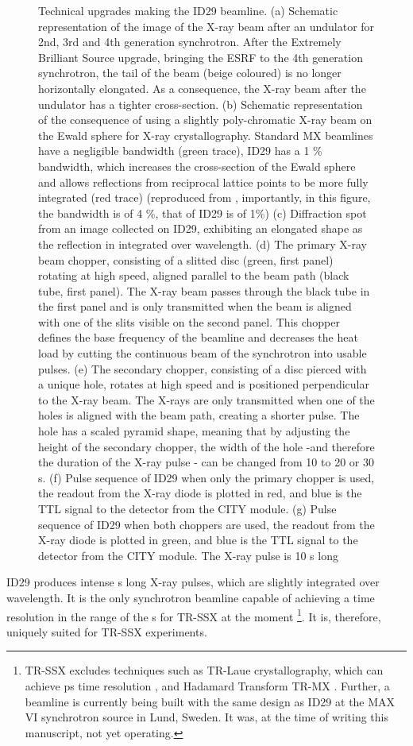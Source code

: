 \begin{figure}[H]
    \caption{Technical upgrades making the ID29 beamline. (a) Schematic representation of the image of the X-ray beam after an undulator for 2nd, 3rd and 4th generation synchrotron. After the Extremely Brilliant Source upgrade, bringing the ESRF to the 4th generation synchrotron, the tail of the beam (beige coloured) is no longer horizontally elongated. As a consequence, the X-ray beam after the undulator has a tighter cross-section. (b) Schematic representation of the consequence of using a slightly poly-chromatic X-ray beam on the Ewald sphere for X-ray crystallography. Standard MX beamlines have a negligible bandwidth (green trace), ID29 has a 1 \% bandwidth, which increases the cross-section of the Ewald sphere and allows reflections from reciprocal lattice points to be more fully integrated (red trace) (reproduced from \cite{dejoieUsingNonmonochromaticMicrobeam2013}, importantly, in this figure, the bandwidth is of 4 \%, that of ID29 is of 1\%) (c) Diffraction spot from an image collected on ID29, exhibiting an elongated shape as the reflection in integrated over wavelength. (d) The primary X-ray beam chopper, consisting of a slitted disc (green, first panel) rotating at high speed, aligned parallel to the beam path (black tube, first panel). The X-ray beam passes through the black tube in the first panel and is only transmitted when the beam is aligned with one of the slits visible on the second panel. This chopper defines the base frequency of the beamline and decreases the heat load by cutting the continuous beam of the synchrotron into usable pulses.  (e) The secondary chopper, consisting of a disc pierced with a unique hole, rotates at high speed and is positioned perpendicular to the X-ray beam. The X-rays are only transmitted when one of the holes is aligned with the beam path,  creating a shorter pulse. The hole has a scaled pyramid shape, meaning that by adjusting the height of the secondary chopper, the width of the hole -and therefore the duration of the X-ray pulse - can be changed from 10 to 20 or 30 \textmu s. (f) Pulse sequence of ID29 when only the primary chopper is used, the readout from the X-ray diode is plotted in red, and blue is the TTL signal to the detector from the CITY module. (g) Pulse sequence of ID29 when both choppers are used, the readout from the X-ray diode is plotted in green, and blue is the TTL signal to the detector from the CITY module. The X-ray pulse is 10 \textmu s long}\label{fig:ID29_beamline}
\end{figure}
ID29 produces intense \textmu s long X-ray pulses, which are slightly integrated over wavelength. It is the only synchrotron beamline capable of achieving a time resolution in the range of the \textmu s for TR-SSX at the moment \footnote{TR-SSX excludes techniques such as TR-Laue crystallography, which can achieve ps time resolution \parencite{moffatLaueDiffractionTimeresolved2019}, and Hadamard Transform TR-MX \parencite{yorkeTimeresolvedCrystallographyUsing2014}. Further, a beamline is currently being built with the same design as ID29 at the MAX VI synchrotron source in Lund, Sweden. It was, at the time of writing this manuscript, not yet operating.}. It is, therefore, uniquely suited for TR-SSX experiments.
